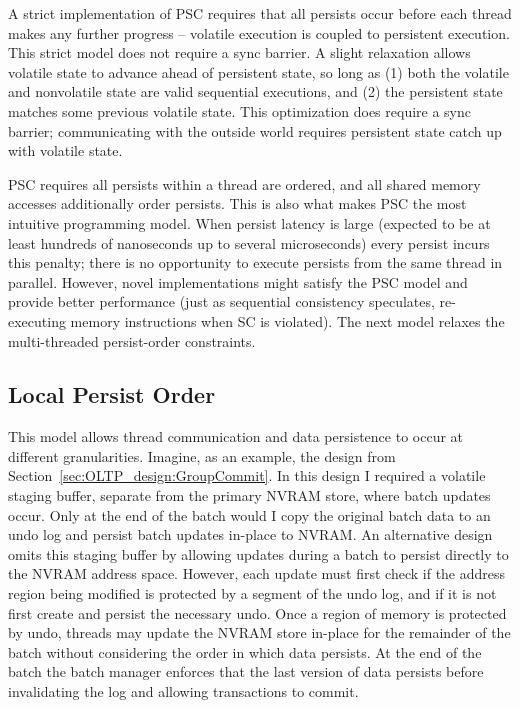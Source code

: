 A strict implementation of PSC requires that all persists occur before each thread makes any further progress -- volatile execution is coupled to persistent execution.
This strict model does not require a sync barrier.
A slight relaxation allows volatile state to advance ahead of persistent state, so long as (1) both the volatile and nonvolatile state are valid sequential executions, and (2) the persistent state matches some previous volatile state.
This optimization does require a sync barrier; communicating with the outside world requires persistent state catch up with volatile state.

PSC requires all persists within a thread are ordered, and all shared memory accesses additionally order persists.
This is also what makes PSC the most intuitive programming model.
When persist latency is large (expected to be at least hundreds of nanoseconds up to several microseconds) every persist incurs this penalty; there is no opportunity to execute persists from the same thread in parallel.
However, novel implementations might satisfy the PSC model and provide better performance (just as sequential consistency speculates, re-executing memory instructions when SC is violated).
The next model relaxes the multi-threaded persist-order constraints.

\subsection{Local Persist Order}
\label{sec:PMC:PersistenceModels:LPO}

This model allows thread communication and data persistence to occur at different granularities.
Imagine, as an example, the \GroupCommit design from Section~\ref{sec:OLTP_design:GroupCommit}.
In this design I required a volatile staging buffer, separate from the primary NVRAM store, where batch updates occur.
Only at the end of the batch would I copy the original batch data to an undo log and persist batch updates in-place to NVRAM.
An alternative design omits this staging buffer by allowing updates during a batch to persist directly to the NVRAM address space.
However, each update must first check if the address region being modified is protected by a segment of the undo log, and if it is not first create and persist the necessary undo.
Once a region of memory is protected by undo, threads may update the NVRAM store in-place for the remainder of the batch without considering the order in which data persists.
At the end of the batch the batch manager enforces that the last version of data persists before invalidating the log and allowing transactions to commit.

